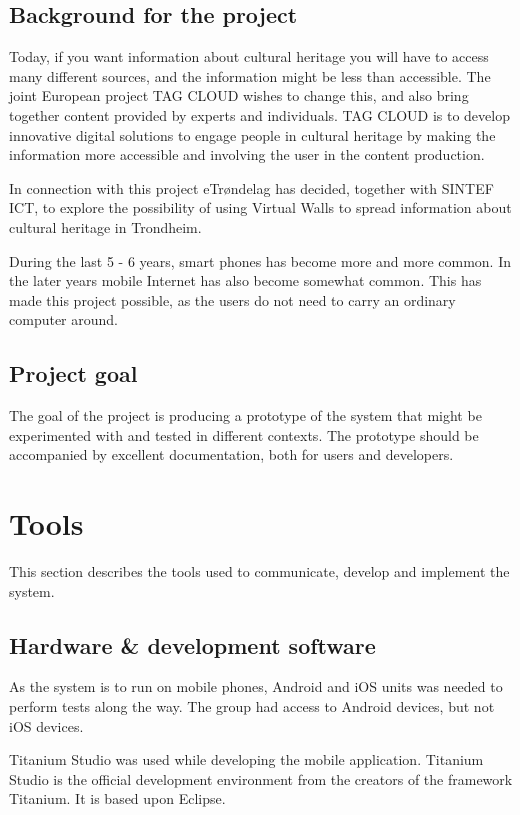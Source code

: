 \documentclass[11pt]{book}
\begin{document}
\subsection{Background for the project}
Today, if you want information about cultural heritage you will have to access many different sources, and the information might be less than accessible. The joint European project TAG CLOUD wishes to change this, and also bring together content provided by experts and individuals. TAG CLOUD is to develop innovative digital solutions to engage people in cultural heritage by making the information more accessible and involving the user in the content production.

In connection with this project eTrøndelag has decided, together with SINTEF ICT, to explore the possibility of using Virtual Walls to spread information about cultural heritage in Trondheim.

During the last 5 - 6 years, smart phones has become more and more common. In the later years mobile Internet has also become somewhat common. This has made this project possible, as the users do not need to carry an ordinary computer around.

\subsection{Project goal}
The goal of the project is producing a prototype of the system that might be experimented with and tested in different contexts. The prototype should be accompanied by excellent documentation, both for users and developers.

\section{Tools}
This section describes the tools used to communicate, develop and implement the system.

\subsection{Hardware \& development software}
As the system is to run on mobile phones, Android and iOS units was needed to perform tests along the way. The group had access to Android devices, but not iOS devices.

Titanium Studio\cite{titaniumStudio} was used while developing the mobile application. Titanium Studio is the official development environment from the creators of the framework Titanium. It is based upon Eclipse.
\end{document}
